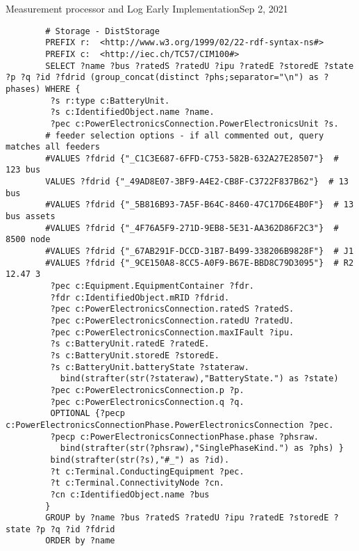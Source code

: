 \begin{entry}{Measurement processor and Log Early Implementation}{Sep 2, 2021}
    \begin{verbatim}
        # Storage - DistStorage
        PREFIX r:  <http://www.w3.org/1999/02/22-rdf-syntax-ns#>
        PREFIX c:  <http://iec.ch/TC57/CIM100#>
        SELECT ?name ?bus ?ratedS ?ratedU ?ipu ?ratedE ?storedE ?state ?p ?q ?id ?fdrid (group_concat(distinct ?phs;separator="\n") as ?phases) WHERE {
         ?s r:type c:BatteryUnit.
         ?s c:IdentifiedObject.name ?name.
         ?pec c:PowerElectronicsConnection.PowerElectronicsUnit ?s.
        # feeder selection options - if all commented out, query matches all feeders
        #VALUES ?fdrid {"_C1C3E687-6FFD-C753-582B-632A27E28507"}  # 123 bus
        VALUES ?fdrid {"_49AD8E07-3BF9-A4E2-CB8F-C3722F837B62"}  # 13 bus
        #VALUES ?fdrid {"_5B816B93-7A5F-B64C-8460-47C17D6E4B0F"}  # 13 bus assets
        #VALUES ?fdrid {"_4F76A5F9-271D-9EB8-5E31-AA362D86F2C3"}  # 8500 node
        #VALUES ?fdrid {"_67AB291F-DCCD-31B7-B499-338206B9828F"}  # J1
        #VALUES ?fdrid {"_9CE150A8-8CC5-A0F9-B67E-BBD8C79D3095"}  # R2 12.47 3
         ?pec c:Equipment.EquipmentContainer ?fdr.
         ?fdr c:IdentifiedObject.mRID ?fdrid.
         ?pec c:PowerElectronicsConnection.ratedS ?ratedS.
         ?pec c:PowerElectronicsConnection.ratedU ?ratedU.
         ?pec c:PowerElectronicsConnection.maxIFault ?ipu.
         ?s c:BatteryUnit.ratedE ?ratedE.
         ?s c:BatteryUnit.storedE ?storedE.
         ?s c:BatteryUnit.batteryState ?stateraw.
           bind(strafter(str(?stateraw),"BatteryState.") as ?state)
         ?pec c:PowerElectronicsConnection.p ?p.
         ?pec c:PowerElectronicsConnection.q ?q.
         OPTIONAL {?pecp c:PowerElectronicsConnectionPhase.PowerElectronicsConnection ?pec.
         ?pecp c:PowerElectronicsConnectionPhase.phase ?phsraw.
           bind(strafter(str(?phsraw),"SinglePhaseKind.") as ?phs) }
         bind(strafter(str(?s),"#_") as ?id).
         ?t c:Terminal.ConductingEquipment ?pec.
         ?t c:Terminal.ConnectivityNode ?cn.
         ?cn c:IdentifiedObject.name ?bus
        }
        GROUP by ?name ?bus ?ratedS ?ratedU ?ipu ?ratedE ?storedE ?state ?p ?q ?id ?fdrid
        ORDER by ?name
    \end{verbatim}

    \results
    


\end{entry}


